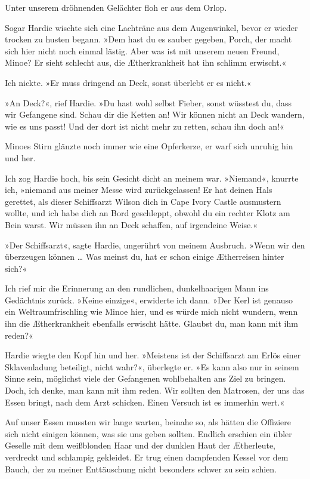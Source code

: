 \bigpar

Unter unserem dröhnenden Gelächter floh er aus dem Orlop.

\bigpar

Sogar Hardie wischte sich eine Lachträne aus dem Augenwinkel, bevor
er wieder trocken zu husten begann. »Dem hast du es sauber gegeben,
Porch, der macht sich hier nicht noch einmal lästig. Aber was ist
mit unserem neuen Freund, Minoe? Er sieht schlecht aus, die
Ætherkrankheit hat ihn schlimm erwischt.«

Ich nickte. »Er muss dringend an Deck, sonst überlebt er es
nicht.«

»An Deck?«, rief Hardie. »Du hast wohl selbst Fieber, sonst
wüsstest du, dass wir Gefangene sind. Schau dir die Ketten an! Wir
können nicht an Deck wandern, wie es uns passt! Und der dort ist
nicht mehr zu retten, schau ihn doch an!«

Minoes Stirn glänzte noch immer wie eine Opferkerze, er warf sich
unruhig hin und her.

Ich zog Hardie hoch, bis sein Gesicht dicht an meinem war.
»Niemand«, knurrte ich, »niemand aus meiner Messe wird
zurückgelassen! Er hat deinen Hals gerettet, als dieser Schiffsarzt
Wilson dich in Cape Ivory Castle ausmustern wollte, und ich habe
dich an Bord geschleppt, obwohl du ein rechter Klotz am Bein warst.
Wir müssen ihn an Deck schaffen, auf irgendeine Weise.«

»Der Schiffsarzt«, sagte Hardie, ungerührt von meinem Ausbruch.
»Wenn wir den überzeugen können \ldots{} Was meinst du, hat er schon
einige Ætherreisen hinter sich?«

Ich rief mir die Erinnerung an den rundlichen, dunkelhaarigen Mann
ins Gedächtnis zurück. »Keine einzige«, erwiderte ich dann. »Der
Kerl ist genauso ein Weltraumfrischling wie Minoe hier, und es
würde mich nicht wundern, wenn ihn die Ætherkrankheit ebenfalls
erwischt hätte. Glaubst du, man kann mit ihm reden?«

Hardie wiegte den Kopf hin und her. »Meistens ist der Schiffsarzt
am Erlös einer Sklavenladung beteiligt, nicht wahr?«, überlegte er.
»Es kann also nur in seinem Sinne sein, möglichst viele der
Gefangenen wohlbehalten ans Ziel zu bringen. Doch, ich denke, man
kann mit ihm reden. Wir sollten den Matrosen, der uns das Essen
bringt, nach dem Arzt schicken. Einen Versuch ist es immerhin
wert.«

\bigpar

Auf unser Essen mussten wir lange warten, beinahe so, als hätten
die Offiziere sich nicht einigen können, was sie uns geben sollten.
Endlich erschien ein übler Geselle mit dem weißblonden Haar und der
dunklen Haut der Ætherleute, verdreckt und schlampig gekleidet. Er
trug einen dampfenden Kessel vor dem Bauch, der zu meiner
Enttäuschung nicht besonders schwer zu sein schien.


